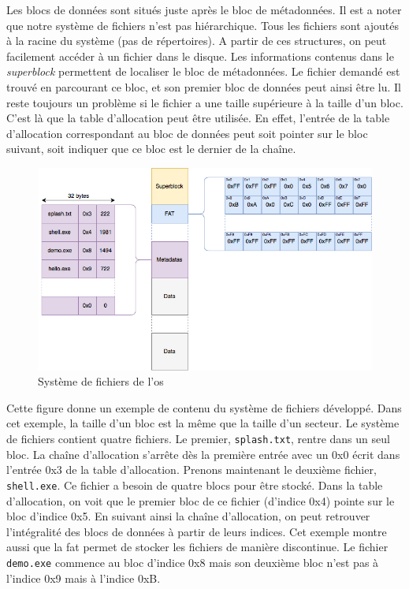 Les blocs de données sont situés juste après le bloc de métadonnées. Il est a noter
que notre système de fichiers n'est pas hiérarchique. Tous les fichiers sont
ajoutés à la racine du système (pas de répertoires). A partir de ces structures,
on peut facilement accéder à un fichier dans le disque. Les informations contenus
dans le \textit{superblock} permettent de localiser le bloc de métadonnées. Le
fichier demandé est trouvé en parcourant ce bloc, et son premier bloc de données
peut ainsi être lu. Il reste toujours un problème si le fichier a une taille supérieure
à la taille d'un bloc. C'est là que la table d'allocation peut être
utilisée. En effet, l'entrée de la table d'allocation correspondant au bloc
de données peut soit pointer sur le bloc suivant, soit indiquer que ce bloc est
le dernier de la chaîne. \newpage

\begin{figure}[!h]
  \centering
  \includegraphics[scale=0.6]{images/microfs.png}
  \caption{Système de fichiers de l'\acrshort{os}}
  \label{microfs}
\end{figure}

Cette figure donne un exemple de contenu du système
de fichiers développé. Dans cet exemple, la taille d'un bloc est la même que la
taille d'un secteur. Le système de fichiers contient quatre fichiers. Le premier,
\texttt{splash.txt}, rentre dans un seul bloc. La chaîne d'allocation
s'arrête dès la première entrée avec un 0x0 écrit dans l'entrée 0x3 de la table
d'allocation. Prenons maintenant le deuxième fichier, \texttt{shell.exe}.
Ce fichier a besoin de quatre blocs pour être stocké. Dans la table d'allocation,
on voit que le premier bloc de ce fichier (d'indice 0x4) pointe sur le bloc
d'indice 0x5. En suivant ainsi la chaîne d'allocation, on peut retrouver l'intégralité
des blocs de données à partir de leurs indices. Cet exemple montre aussi que la
\acrshort{fat} permet de stocker les fichiers de manière discontinue. Le fichier
\texttt{demo.exe} commence au bloc d'indice 0x8 mais son deuxième bloc
n'est pas à l'indice 0x9 mais à l'indice 0xB.


